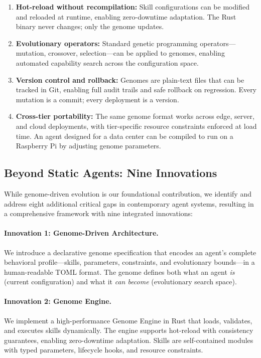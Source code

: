 \documentclass{article}
\begin{document}
\begin{enumerate}[leftmargin=*]
    \item \textbf{Hot-reload without recompilation:} Skill configurations can be modified and reloaded at runtime, enabling zero-downtime adaptation. The Rust binary never changes; only the genome updates.
    
    \item \textbf{Evolutionary operators:} Standard genetic programming operators—mutation, crossover, selection—can be applied to genomes, enabling automated capability search across the configuration space.
    
    \item \textbf{Version control and rollback:} Genomes are plain-text files that can be tracked in Git, enabling full audit trails and safe rollback on regression. Every mutation is a commit; every deployment is a version.
    
    \item \textbf{Cross-tier portability:} The same genome format works across edge, server, and cloud deployments, with tier-specific resource constraints enforced at load time. An agent designed for a data center can be compiled to run on a Raspberry Pi by adjusting genome parameters.
\end{enumerate}

\subsection{Beyond Static Agents: Nine Innovations}

While genome-driven evolution is our foundational contribution, we identify and address eight additional critical gaps in contemporary agent systems, resulting in a comprehensive framework with nine integrated innovations:

\paragraph{Innovation 1: Genome-Driven Architecture.} We introduce a declarative genome specification that encodes an agent's complete behavioral profile—skills, parameters, constraints, and evolutionary bounds—in a human-readable TOML format. The genome defines both what an agent \textit{is} (current configuration) and what it \textit{can become} (evolutionary search space).

\paragraph{Innovation 2: Genome Engine.} We implement a high-performance Genome Engine in Rust that loads, validates, and executes skills dynamically. The engine supports hot-reload with consistency guarantees, enabling zero-downtime adaptation. Skills are self-contained modules with typed parameters, lifecycle hooks, and resource constraints.
\end{document}
